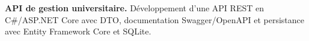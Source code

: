 
\begin{cvparagraph}
\noindent\textbf{API de gestion universitaire.} Développement d’une API REST en C\#/ASP.NET Core avec DTO, documentation Swagger/OpenAPI et persistance avec Entity Framework Core et SQLite.
\end{cvparagraph}
